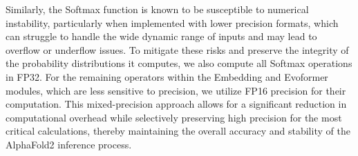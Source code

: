 Similarly, the Softmax function is known to be susceptible to numerical instability, particularly when implemented with lower precision formats, which can struggle to handle the wide dynamic range of inputs and may lead to overflow or underflow issues. To mitigate these risks and preserve the integrity of the probability distributions it computes, we also compute all Softmax operations in FP32. For the remaining operators within the Embedding and Evoformer modules, which are less sensitive to precision, we utilize FP16 precision for their computation. This mixed-precision approach allows for a significant reduction in computational overhead while selectively preserving high precision for the most critical calculations, thereby maintaining the overall accuracy and stability of the AlphaFold2 inference process.



